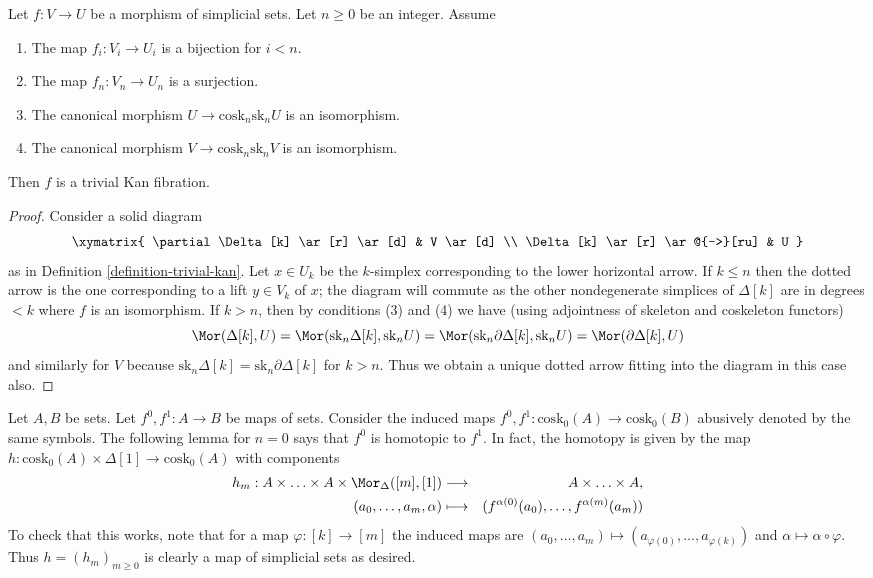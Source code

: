 \begin{lemma}
\label{lemma-section}
Let $f : V \to U$ be a morphism of simplicial sets. Let $n \geq 0$ be an
integer. Assume
\begin{enumerate}
\item The map $f_i : V_i \to U_i$ is a bijection for $i < n$.
\item The map $f_n : V_n \to U_n$ is a surjection.
\item The canonical morphism $U \to \text{cosk}_n \text{sk}_n U$
is an isomorphism.
\item The canonical morphism $V \to \text{cosk}_n \text{sk}_n V$
is an isomorphism.
\end{enumerate}
Then $f$ is a trivial Kan fibration.
\end{lemma}

\begin{proof}
Consider a solid diagram
$$
\xymatrix{
\partial \Delta[k] \ar[r] \ar[d] & V \ar[d] \\
\Delta[k] \ar[r] \ar@{-->}[ru] & U
}
$$
as in Definition \ref{definition-trivial-kan}. Let $x \in U_k$ be
the $k$-simplex corresponding to the lower horizontal arrow.
If $k \leq n$ then the dotted arrow is the one corresponding to
a lift $y \in V_k$ of $x$; the diagram will commute as the other
nondegenerate simplices of $\Delta[k]$ are in degrees $< k$ where
$f$ is an isomorphism. If $k > n$, then by conditions (3) and (4)
we have (using adjointness of skeleton and coskeleton functors)
$$
\Mor(\Delta[k], U) =
\Mor(\text{sk}_n\Delta[k], \text{sk}_nU) =
\Mor(\text{sk}_n\partial\Delta[k], \text{sk}_nU) =
\Mor(\partial \Delta[k], U)
$$
and similarly for $V$ because
$\text{sk}_n\Delta[k] = \text{sk}_n\partial\Delta[k]$ for $k > n$.
Thus we obtain a unique dotted arrow fitting into the diagram in
this case also.
\end{proof}

\noindent
Let $A, B$ be sets. Let $f^0, f^1 : A \to B$ be maps of sets.
Consider the induced maps $f^0, f^1 : \text{cosk}_0(A) \to \text{cosk}_0(B)$
abusively denoted by the same symbols. The following lemma for $n = 0$
says that $f^0$ is homotopic to $f^1$. In fact, the
homotopy is given by the map $h : \text{cosk}_0(A) \times
\Delta[1] \to \text{cosk}_0(A)$ with components
\begin{eqnarray*}
h_m : A \times \ldots \times A \times \Mor_{\Delta}([m], [1])
& \longrightarrow &
A \times \ldots \times A, \\
(a_0, \ldots, a_m, \alpha) & \longmapsto &
(f^{\alpha(0)}(a_0), \ldots, f^{\alpha(m)}(a_m))
\end{eqnarray*}
To check that this works, note that for a map $\varphi : [k] \to [m]$
the induced maps are
$(a_0, \ldots, a_m) \mapsto (a_{\varphi(0)}, \ldots, a_{\varphi(k)})$
and $\alpha \mapsto \alpha \circ \varphi$. Thus $h = (h_m)_{m \geq 0}$
is clearly a map of simplicial sets as desired.

